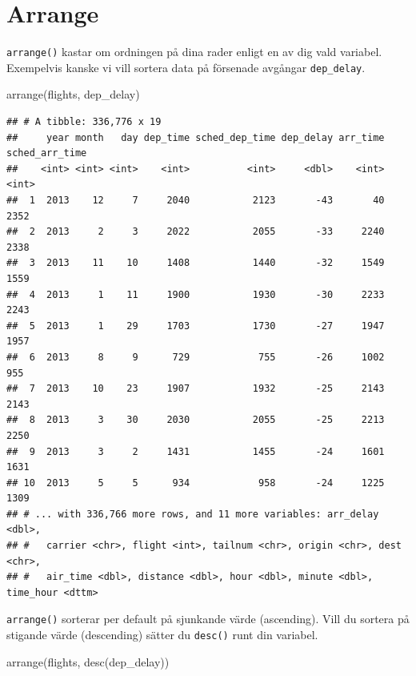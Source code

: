 \documentclass[
]{book}
\newenvironment{Shaded}{\begin{snugshade}}{\end{snugshade}}
\newcommand{\FunctionTok}[1]{\textcolor[rgb]{0.00,0.00,0.00}{#1}}
\newcommand{\NormalTok}[1]{#1}
\begin{document}
\hypertarget{arrange}{%
\section{Arrange}\label{arrange}}

\texttt{arrange()} kastar om ordningen på dina rader enligt en av dig vald variabel. Exempelvis kanske vi vill sortera data på försenade avgångar \texttt{dep\_delay}.

\begin{Shaded}
\begin{Highlighting}[]
\FunctionTok{arrange}\NormalTok{(flights, dep\_delay)}
\end{Highlighting}
\end{Shaded}

\begin{verbatim}
## # A tibble: 336,776 x 19
##     year month   day dep_time sched_dep_time dep_delay arr_time sched_arr_time
##    <int> <int> <int>    <int>          <int>     <dbl>    <int>          <int>
##  1  2013    12     7     2040           2123       -43       40           2352
##  2  2013     2     3     2022           2055       -33     2240           2338
##  3  2013    11    10     1408           1440       -32     1549           1559
##  4  2013     1    11     1900           1930       -30     2233           2243
##  5  2013     1    29     1703           1730       -27     1947           1957
##  6  2013     8     9      729            755       -26     1002            955
##  7  2013    10    23     1907           1932       -25     2143           2143
##  8  2013     3    30     2030           2055       -25     2213           2250
##  9  2013     3     2     1431           1455       -24     1601           1631
## 10  2013     5     5      934            958       -24     1225           1309
## # ... with 336,766 more rows, and 11 more variables: arr_delay <dbl>,
## #   carrier <chr>, flight <int>, tailnum <chr>, origin <chr>, dest <chr>,
## #   air_time <dbl>, distance <dbl>, hour <dbl>, minute <dbl>, time_hour <dttm>
\end{verbatim}

\texttt{arrange()} sorterar per default på sjunkande värde (ascending). Vill du sortera på stigande värde (descending) sätter du \texttt{desc()} runt din variabel.

\begin{Shaded}
\begin{Highlighting}[]
\FunctionTok{arrange}\NormalTok{(flights, }\FunctionTok{desc}\NormalTok{(dep\_delay))}
\end{Highlighting}
\end{Shaded}
\end{document}
